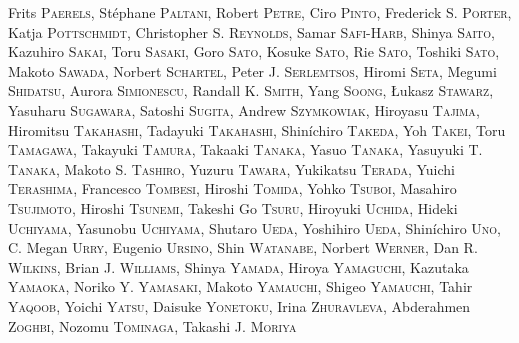 {Frits \textsc{Paerels},
St\'ephane \textsc{Paltani},
Robert \textsc{Petre},
Ciro \textsc{Pinto},
Frederick S. \textsc{Porter},
Katja \textsc{Pottschmidt},
Christopher S. \textsc{Reynolds},
Samar \textsc{Safi-Harb},
Shinya \textsc{Saito},
Kazuhiro \textsc{Sakai},
Toru \textsc{Sasaki},
Goro \textsc{Sato},
Kosuke \textsc{Sato},
Rie \textsc{Sato},
Toshiki \textsc{Sato},
Makoto \textsc{Sawada},
Norbert \textsc{Schartel},
Peter J. \textsc{Serlemtsos},
Hiromi \textsc{Seta},
Megumi \textsc{Shidatsu},
Aurora \textsc{Simionescu},
Randall K. \textsc{Smith},
Yang \textsc{Soong},
{\L}ukasz \textsc{Stawarz},
Yasuharu \textsc{Sugawara},
Satoshi \textsc{Sugita},
Andrew \textsc{Szymkowiak},
Hiroyasu \textsc{Tajima},
Hiromitsu \textsc{Takahashi},
Tadayuki \textsc{Takahashi},
Shin\'ichiro \textsc{Takeda},
Yoh \textsc{Takei},
Toru \textsc{Tamagawa},
Takayuki \textsc{Tamura},
Takaaki \textsc{Tanaka},
Yasuo \textsc{Tanaka},
Yasuyuki T. \textsc{Tanaka},
Makoto S. \textsc{Tashiro},
Yuzuru \textsc{Tawara},
Yukikatsu \textsc{Terada},
Yuichi \textsc{Terashima},
Francesco \textsc{Tombesi},
Hiroshi \textsc{Tomida},
Yohko \textsc{Tsuboi},
Masahiro \textsc{Tsujimoto},
Hiroshi \textsc{Tsunemi},
Takeshi Go \textsc{Tsuru},
Hiroyuki \textsc{Uchida},
Hideki \textsc{Uchiyama},
Yasunobu \textsc{Uchiyama},
Shutaro \textsc{Ueda},
Yoshihiro \textsc{Ueda},
Shin\'ichiro \textsc{Uno},
C. Megan \textsc{Urry},
Eugenio \textsc{Ursino},
Shin \textsc{Watanabe},
Norbert \textsc{Werner},
Dan R. \textsc{Wilkins},
Brian J. \textsc{Williams},
Shinya \textsc{Yamada},
Hiroya \textsc{Yamaguchi},
Kazutaka \textsc{Yamaoka},
Noriko Y. \textsc{Yamasaki},
Makoto \textsc{Yamauchi},
Shigeo \textsc{Yamauchi},
Tahir \textsc{Yaqoob},
Yoichi \textsc{Yatsu},
Daisuke \textsc{Yonetoku},
Irina \textsc{Zhuravleva},
Abderahmen \textsc{Zoghbi},
%
Nozomu \textsc{Tominaga},
Takashi J. \textsc{Moriya}
%
}
